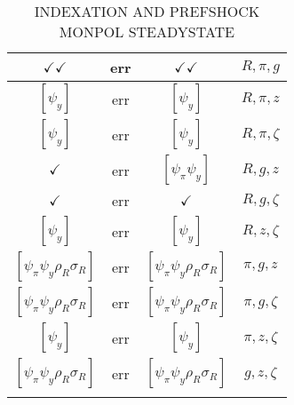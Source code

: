 \documentclass[a4paper,10pt]{article}
\begin{document}
\begin{longtable}{|c|c|c|c|}
\hline
$\checkmark\checkmark$ & err & $\checkmark\checkmark$ & ${R},{\pi},{g}$ \\
\hline
$[\psi_y ]$ & err & $[\psi_y ]$ & ${R},{\pi},{z}$ \\
\hline
$[\psi_y ]$ & err & $[\psi_y ]$ & ${R},{\pi},{\zeta}$ \\
\hline
$\checkmark$ & err & $[\psi_\pi \psi_y ]$ & ${R},{g},{z}$ \\
\hline
$\checkmark$ & err & $\checkmark$ & ${R},{g},{\zeta}$ \\
\hline
$[\psi_y ]$ & err & $[\psi_y ]$ & ${R},{z},{\zeta}$ \\
\hline
$[\psi_\pi \psi_y \rho_R \sigma_R ]$ & err & $[\psi_\pi \psi_y \rho_R \sigma_R ]$ & ${\pi},{g},{z}$ \\
\hline
$[\psi_\pi \psi_y \rho_R \sigma_R ]$ & err & $[\psi_\pi \psi_y \rho_R \sigma_R ]$ & ${\pi},{g},{\zeta}$ \\
\hline
$[\psi_y ]$ & err & $[\psi_y ]$ & ${\pi},{z},{\zeta}$ \\
\hline
$[\psi_\pi \psi_y \rho_R \sigma_R ]$ & err & $[\psi_\pi \psi_y \rho_R \sigma_R ]$ & ${g},{z},{\zeta}$ \\
\hline
\caption{INDEXATION AND PREFSHOCK MONPOL STEADYSTATE}
\label{table:MyTableLabel}
\end{longtable}
\end{document}
